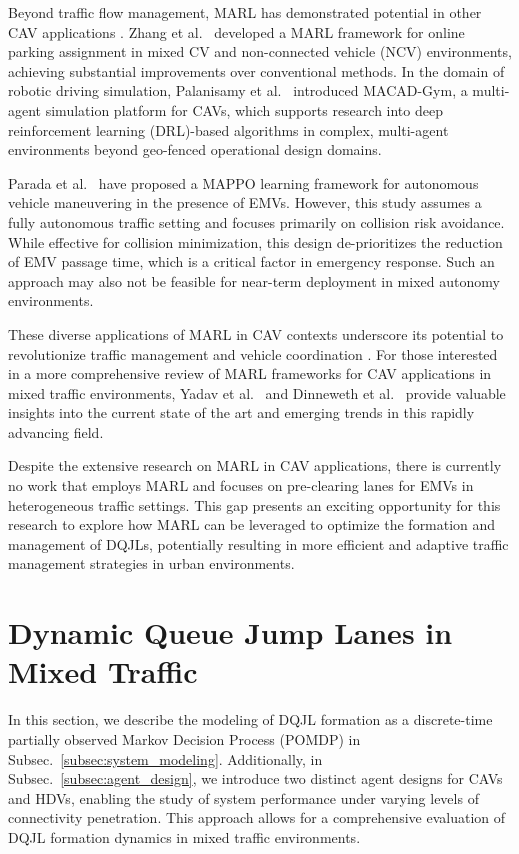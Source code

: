 Beyond traffic flow management, MARL has demonstrated potential in other CAV applications \cite{liang2024rescuing,cao2024multi,you2024calibrating}. Zhang et al.~\cite{ZHANG2022parking} developed a MARL framework for online parking assignment in mixed CV and non-connected vehicle (NCV) environments, achieving substantial improvements over conventional methods. In the domain of robotic driving simulation, Palanisamy et al.~\cite{Palanisamy2020Driving} introduced MACAD-Gym, a multi-agent simulation platform for CAVs, which supports research into deep reinforcement learning (DRL)-based algorithms in complex, multi-agent environments beyond geo-fenced operational design domains.

Parada et al.~\cite{parada2023safe} have proposed a MAPPO learning framework for autonomous vehicle maneuvering in the presence of EMVs. However, this study assumes a fully autonomous traffic setting and focuses primarily on collision risk avoidance. While effective for collision minimization, this design de-prioritizes the reduction of EMV passage time, which is a critical factor in emergency response. Such an approach may also not be feasible for near-term deployment in mixed autonomy environments.

These diverse applications of MARL in CAV contexts underscore its potential to revolutionize traffic management and vehicle coordination \cite{you2024mine,sun2024medical,huang2024cross}. For those interested in a more comprehensive review of MARL frameworks for CAV applications in mixed traffic environments, Yadav et al.~\cite{yadav2023comprehensive} and Dinneweth et al.~\cite{Dinneweth2022Survey} provide valuable insights into the current state of the art and emerging trends in this rapidly advancing field.

Despite the extensive research on MARL in CAV applications, there is currently no work that employs MARL and focuses on pre-clearing lanes for EMVs in heterogeneous traffic settings. This gap presents an exciting opportunity for this research to explore how MARL can be leveraged to optimize the formation and management of DQJLs, potentially resulting in more efficient and adaptive traffic management strategies in urban environments.

\section{Dynamic Queue Jump Lanes in Mixed Traffic}
In this section, we describe the modeling of DQJL formation as a discrete-time partially observed Markov Decision Process (POMDP) in Subsec.~\ref{subsec:system_modeling}. Additionally, in Subsec.~\ref{subsec:agent_design}, we introduce two distinct agent designs for CAVs and HDVs, enabling the study of system performance under varying levels of connectivity penetration. This approach allows for a comprehensive evaluation of DQJL formation dynamics in mixed traffic environments.
\label{sec:modeling}

